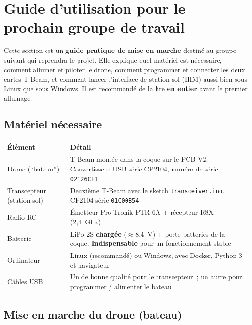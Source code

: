 \documentclass[12pt,a4paper]{article}
\newcommand{\file}[1]{\texttt{#1}}
\begin{document}
\section{Guide d'utilisation pour le prochain groupe de travail}
\label{sec:guia}

Cette section est un \textbf{guide pratique de mise en marche} destin\'e au groupe
suivant qui reprendra le projet. Elle explique quel mat\'eriel est n\'ecessaire,
comment allumer et piloter le drone, comment programmer et connecter les deux
cartes T-Beam, et comment lancer l'interface de station sol (IHM) aussi bien sous
Linux que sous Windows. Il est recommand\'e de la lire \textbf{en entier} avant le
premier allumage.

\subsection{Mat\'eriel n\'ecessaire}

\begin{longtable}{L{4.5cm} L{8.5cm}}
  \toprule
  \textcolor{tableheadfg}{\textbf{\'El\'ement}} &
  \textcolor{tableheadfg}{\textbf{D\'etail}} \\
  \midrule
  \endhead
  \bottomrule
  \endfoot
  Drone (``bateau'') & T-Beam mont\'ee dans la coque sur le PCB V2. Convertisseur
                       USB-s\'erie CP2104, num\'ero de s\'erie \texttt{02126CF1} \\[3pt]
  Transcepteur (station sol) & Deuxi\`eme T-Beam avec le sketch
                       \file{transceiver.ino}. CP2104 s\'erie \texttt{01C00B54} \\[3pt]
  Radio RC & \'Emetteur Pro-Tronik PTR-6A + r\'ecepteur R8X (2,4~GHz) \\[3pt]
  Batterie & LiPo 2S \textbf{charg\'ee} ($\approx$8,4~V) + porte-batteries de la
             coque. \textbf{Indispensable} pour un fonctionnement stable \\[3pt]
  Ordinateur & Linux (recommand\'e) ou Windows, avec Docker, Python 3 et navigateur \\[3pt]
  C\^ables USB & Un de bonne qualit\'e pour le transcepteur~; un autre pour
                programmer / alimenter le bateau \\
\end{longtable}

\subsection{Mise en marche du drone (bateau)}
\end{document}
